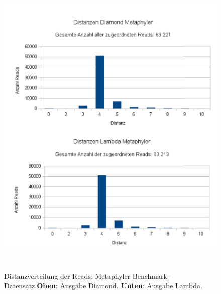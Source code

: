 \documentclass[10pt, a4paper]{report}[08.12.2015]
\begin{document}
\begin{figure}[H]
      \centering
      \noindent\includegraphics[width=\linewidth,height=15cm,
      keepaspectratio]{Abbildungen/Metaphyler_Distanzen_both.png}
      \caption[Distanzverteilung der Reads: Metaphyler Benchmark-Datensatz.]{\small{Distanzverteilung der Reads: Metaphyler Benchmark-Datensatz.\newline \textbf{Oben}: Ausgabe Diamond. \textbf{Unten}: Ausgabe Lambda.}}
      \label{fig:metaphyler}
    \end{figure}
\end{document}
